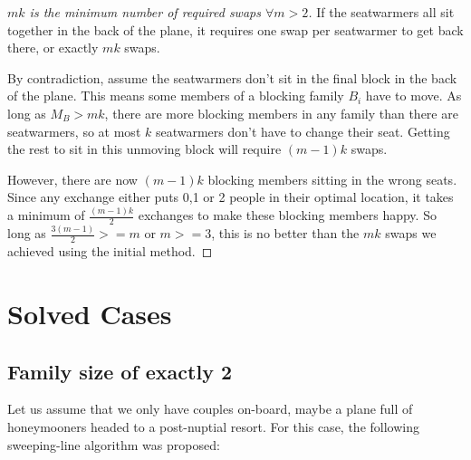 \documentclass[a4paper]{article}
\begin{document}
\begin{figure}[H]
\centering
{}
\end{figure}

\begin{proof}[$mk$ is the minimum number of required swaps $\forall m > 2$]
If the seatwarmers all sit together in the back of the plane, it requires one swap per seatwarmer to get back there, or exactly $mk$ swaps.  

By contradiction, assume the seatwarmers don't sit in the final block in the back of the plane.  This means some members of a blocking family $B_i$ have to move.  As long as $M_B > mk$, there are more blocking members in any family than there are seatwarmers, so at most $k$ seatwarmers don't have to change their seat.  Getting the rest to sit in this unmoving block will require $(m-1)k$ swaps.

However, there are now $(m-1)k$ blocking members sitting in the wrong seats.  Since any exchange either puts 0,1 or 2 people in their optimal location, it takes a minimum of $\frac{(m-1)k}{2}$ exchanges to make these blocking members happy.  So long as $\frac{3(m-1)}{2} >= m$ or $m>=3$, this is no better than the $mk$ swaps we achieved using the initial method.
\end{proof}


\section{Solved Cases}

\subsection{Family size of exactly 2}

\noindent
Let us assume that we only have couples on-board, maybe a plane full of honeymooners headed to a post-nuptial resort. For this case, the following sweeping-line algorithm was proposed:
\end{document}

